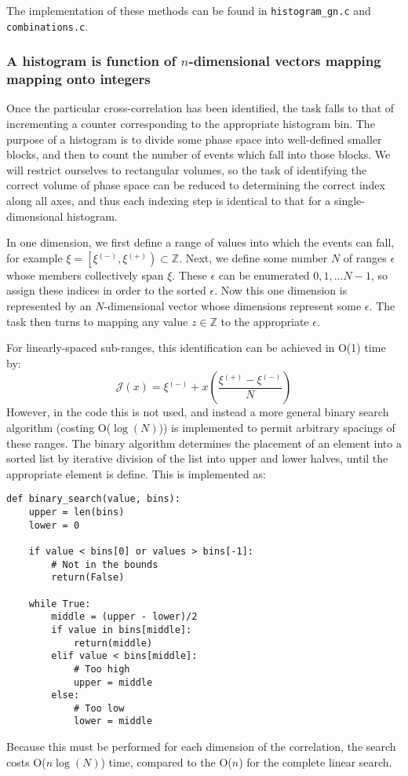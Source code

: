 \documentclass{article}
\newcommand{\parens}[1]{\ensuremath{\left( #1 \right)}}
\newcommand{\integers}{\ensuremath{\mathbb{Z}}}
\newcommand{\timewindow}{\ensuremath{\xi}}
\newcommand{\resolution}{\ensuremath{\epsilon}}
\newcommand{\Index}{\ensuremath{\mathcal{J}}}
\newcommand{\upplus}{\ensuremath{^{(+)}}}
\newcommand{\upminus}{\ensuremath{^{(-)}}}
\begin{document}
The implementation of these methods can be found in \texttt{histogram\_gn.c} and \texttt{combinations.c}.

\subsubsection{A histogram is function of $n$-dimensional vectors mapping mapping onto integers}
Once the particular cross-correlation has been identified, the task falls to that of incrementing a counter corresponding to the appropriate histogram bin. The purpose of a histogram is to divide some phase space into well-defined smaller blocks, and then to count the number of events which fall into those blocks. We will restrict ourselves to rectangular volumes, so the task of identifying the correct volume of phase space can be reduced to determining the correct index along all axes, and thus each indexing step is identical to that for a single-dimensional histogram. 

In one dimension, we first define a range of values into which the events can fall, for example $\timewindow=\left[\timewindow\upminus,\timewindow\upplus\right)\subset\integers$. Next, we define some number $N$ of ranges $\resolution$ whose members collectively span $\timewindow$. These $\resolution$ can be enumerated $0,1,\ldots N-1$, so assign these indices in order to the sorted $\resolution$. Now this one dimension is represented by an $N$-dimensional vector whose dimensions represent some $\resolution$. The task then turns to mapping any value $z\in\integers$ to the appropriate $\resolution$.

For linearly-spaced sub-ranges, this identification can be achieved in O(1) time by:
\begin{equation}
\Index(x) = \timewindow\upminus + x\parens{\frac{\timewindow\upplus-\timewindow\upminus}{N}}
\end{equation}
However, in the code this is not used, and instead a more general binary search algorithm (costing O($\log(N)$)) is implemented to permit arbitrary spacings of these ranges. The binary algorithm determines the placement of an element into a sorted list by iterative division of the list into upper and lower halves, until the appropriate element is define. This is implemented as:
\begin{lstlisting}
def binary_search(value, bins):
    upper = len(bins)
    lower = 0
    
    if value < bins[0] or values > bins[-1]:
        # Not in the bounds
        return(False)
     
    while True:
        middle = (upper - lower)/2
        if value in bins[middle]:
            return(middle)
        elif value < bins[middle]:
            # Too high
            upper = middle
        else:
            # Too low
            lower = middle
\end{lstlisting}
Because this must be performed for each dimension of the correlation, the search costs O($n\log{(N)}$) time, compared to the O($n$) for the complete linear search. 
\end{document}
